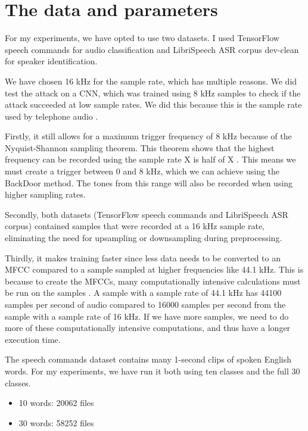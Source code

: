 \documentclass{report}
\theoremstyle{definition}
\theoremstyle{remark}
\begin{document}
\section{The data and parameters \label{DATANADPARAM}}
For my experiments, we have opted to use two datasets. I used TensorFlow speech commands \cite{Speech_commands} for audio classification and LibriSpeech ASR corpus dev-clean \cite{7178964} for speaker identification.

We have chosen 16 kHz for the sample rate, which has multiple reasons. We did test the attack on a CNN, which was trained using 8 kHz samples to check if the attack succeeded at low sample rates. We did this because this is the sample rate used by telephone audio \cite{rabiner1978digital}.

Firstly, it still allows for a maximum trigger frequency of 8 kHz because of the Nyquist-Shannon sampling theorem. This theorem shows that the highest frequency can be recorded using the sample rate X is half of X \cite{por2019nyquist}. This means we must create a trigger between 0 and 8 kHz, which we can achieve using the BackDoor method. The tones from this range will also be recorded when using higher sampling rates. 

Secondly, both datasets (TensorFlow speech commands and LibriSpeech ASR corpus) contained samples that were recorded at a 16 kHz sample rate, eliminating the need for upsampling or downsampling during preprocessing.

Thirdly, it makes training faster since less data needs to be converted to an MFCC compared to a sample sampled at higher frequencies like 44.1 kHz. This is because to create the MFCCs, many computationally intensive calculations must be run on the samples \cite{1692543}. A sample with a sample rate of 44.1 kHz has 44100 samples per second of audio compared to 16000 samples per second from the sample with a sample rate of 16 kHz. If we have more samples, we need to do more of these computationally intensive computations, and thus have a longer execution time. 

The speech commands dataset contains many 1-second clips of spoken English words. For my experiments, we have run it both using ten classes and the full 30 classes. 

\begin{itemize}
    \item 10 words: 20062 files
    \item 30 words: 58252 files
\end{itemize}
\end{document}
